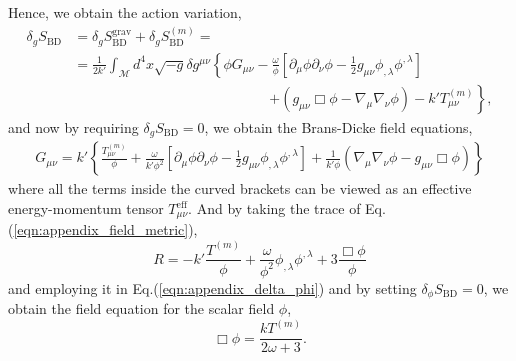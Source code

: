 Hence, we obtain the action variation,
\begin{align}
    \delta_g S_{\mathrm{BD}}&=\delta_g S^{\mathrm{grav}}_{\mathrm{BD}} + \delta_g S^{(m)}_{\mathrm{BD}}=\nonumber\\
    &=\frac{1}{2k'}\int_{\mathcal{M}}d^4x \sqrt{-g}\delta g^{\mu\nu}\left\{\phi G_{\mu \nu}-\frac{\omega}{\phi}\left[\partial_\mu \phi \partial_\nu \phi-\frac{1}{2}g_{\mu\nu}\phi_{,\lambda}\phi^{,\lambda}\right]\right.\label{eqn:appendix_delta_metric}\\
    &\qquad\qquad\qquad\qquad\qquad\qquad\qquad\left.+\left(g_{\mu\nu}\Box\phi-\nabla_\mu\nabla_\nu\phi\right) -k'T_{\mu\nu}^{(m)}\right\},\nonumber
\end{align}
and now by requiring $\delta_g S_{\mathrm{BD}}=0$, we obtain the Brans-Dicke field equations,
\begin{align}
    G_{\mu\nu}=k'\left\{\frac{T_{\mu\nu}^{(m)}}{\phi}+\frac{\omega}{k'\phi^2}\left[\partial_\mu \phi \partial_\nu \phi-\frac{1}{2}g_{\mu\nu}\phi_{,\lambda}\phi^{,\lambda}\right]+\frac{1}{k'\phi}\left(\nabla_\mu\nabla_\nu\phi-g_{\mu\nu}\Box\phi\right)\right\}
    \label{eqn:appendix_field_metric}
\end{align}
where all the terms inside the curved brackets can be viewed as an effective energy-momentum tensor $T_{\mu\nu}^{\mathrm{eff}}$. And by taking the trace of Eq.(\ref{eqn:appendix_field_metric}),
\begin{equation}
    R=-k'\frac{T^{(m)}}{\phi}+\frac{\omega}{\phi^2}\phi_{,\lambda}\phi^{,\lambda}+3\frac{\Box\phi}{\phi}
\end{equation}
and employing it in Eq.(\ref{eqn:appendix_delta_phi}) and by setting $\delta_\phi S_{\mathrm{BD}}=0$, we obtain the field equation for the scalar field $\phi$,
\begin{equation}
    \Box\phi=\frac{kT^{(m)}}{2\omega+3}.
    \label{eqn:appendix_field_phi}
\end{equation}


